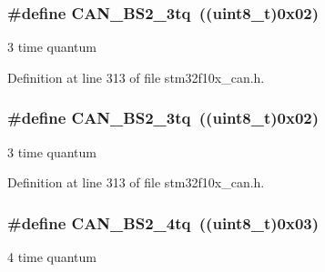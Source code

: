 \subsubsection[{\texorpdfstring{C\+A\+N\+\_\+\+B\+S2\+\_\+3tq}{CAN_BS2_3tq}}]{\setlength{\rightskip}{0pt plus 5cm}\#define C\+A\+N\+\_\+\+B\+S2\+\_\+3tq~(({\bf uint8\+\_\+t})0x02)}\hypertarget{group___c_a_n__time__quantum__in__bit__segment__2_gab3d325ce4a5d0eb1ee8ee50ad4ec7e49}{}\label{group___c_a_n__time__quantum__in__bit__segment__2_gab3d325ce4a5d0eb1ee8ee50ad4ec7e49}
3 time quantum 

Definition at line 313 of file stm32f10x\+\_\+can.\+h.

\subsubsection[{\texorpdfstring{C\+A\+N\+\_\+\+B\+S2\+\_\+3tq}{CAN_BS2_3tq}}]{\setlength{\rightskip}{0pt plus 5cm}\#define C\+A\+N\+\_\+\+B\+S2\+\_\+3tq~(({\bf uint8\+\_\+t})0x02)}\hypertarget{group___c_a_n__time__quantum__in__bit__segment__2_gab3d325ce4a5d0eb1ee8ee50ad4ec7e49}{}\label{group___c_a_n__time__quantum__in__bit__segment__2_gab3d325ce4a5d0eb1ee8ee50ad4ec7e49}
3 time quantum 

Definition at line 313 of file stm32f10x\+\_\+can.\+h.

\subsubsection[{\texorpdfstring{C\+A\+N\+\_\+\+B\+S2\+\_\+4tq}{CAN_BS2_4tq}}]{\setlength{\rightskip}{0pt plus 5cm}\#define C\+A\+N\+\_\+\+B\+S2\+\_\+4tq~(({\bf uint8\+\_\+t})0x03)}\hypertarget{group___c_a_n__time__quantum__in__bit__segment__2_gaaff1c1cdd809f185299971c6437f32a0}{}\label{group___c_a_n__time__quantum__in__bit__segment__2_gaaff1c1cdd809f185299971c6437f32a0}
4 time quantum 

